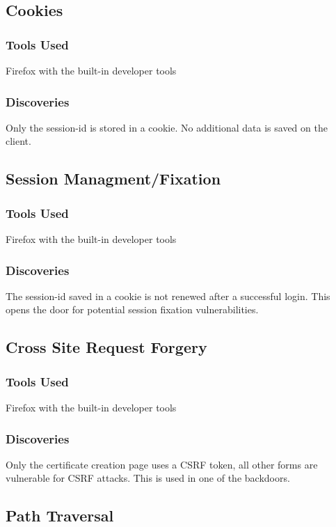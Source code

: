 \documentclass{article}
\begin{document}
\subsection{Cookies}
\subsubsection*{Tools Used}
Firefox with the built-in developer tools

\subsubsection*{Discoveries}
Only the session-id is stored in a cookie. No additional data is saved on the client.

\subsection{Session Managment/Fixation}
\subsubsection*{Tools Used}
Firefox with the built-in developer tools

\subsubsection*{Discoveries}
The session-id saved in a cookie is not renewed after a successful login. This opens the door for potential session fixation vulnerabilities.

\subsection{Cross Site Request Forgery}
\subsubsection*{Tools Used}
Firefox with the built-in developer tools

\subsubsection*{Discoveries}
Only the certificate creation page uses a CSRF token, all other forms are vulnerable for CSRF attacks. This is used in one of the backdoors.

\subsection{Path Traversal}
\end{document}
